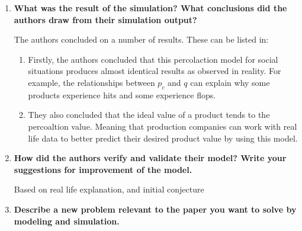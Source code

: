 \documentclass[article, 11pt, a4paper]{memoir}
\begin{document}
\begin{enumerate}[left=0pt, itemsep=20pt, label={\(\square\)}]
    \item \textbf{What was the result of the simulation? What conclusions did the authors
        draw from their simulation output?}

        The authors concluded on a number of results. These can be listed in:
        \begin{enumerate}[left=0pt, itemsep=0pt]
            \item Firstly, the authors concluded that this percolaction model for social
                situations produces almost identical results as observed in reality. For
                example, the relationships between \(p_c\) and \(q\) can explain why some
                products experience hits and some experience flops.
            \item They also concluded that the ideal value of a product tends to the
                percoaltion value. Meaning that production companies can work with real
                life data to better predict their desired product value by using this
                model.
        \end{enumerate}


    \item \textbf{How did the authors verify and validate their model? Write your
        suggestions for improvement of the model.}

        Based on real life explanation, and initial conjecture


    \item \textbf{Describe a new problem relevant to the paper you want to solve by
        modeling and simulation.}

\end{enumerate}
\end{document}
